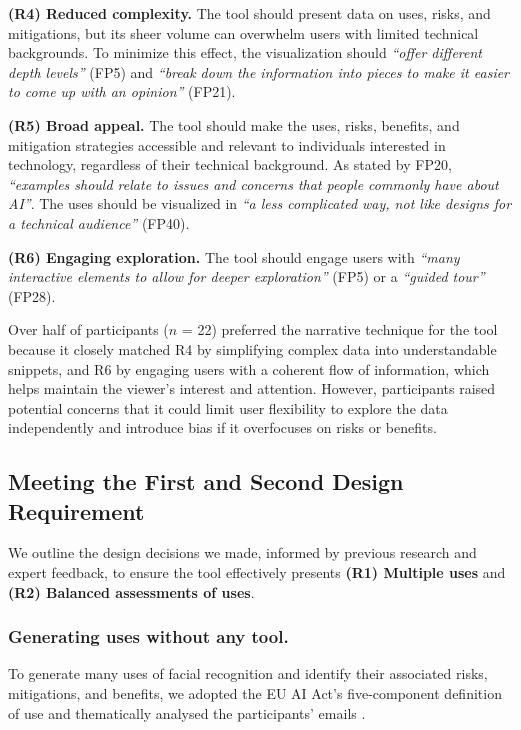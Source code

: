 \vspace{1.25pt}
\noindent\textbf{(R4) Reduced complexity.} 
The tool should present data on uses, risks, and mitigations, but its sheer volume can overwhelm users with limited technical backgrounds. To minimize this effect, the visualization should \emph{``offer different depth levels''} (FP5) and \emph{``break down the information into pieces to make it easier to come up with an opinion''} (FP21).

\vspace{1.25pt}
\noindent\textbf{(R5) Broad appeal.} 
The tool should make the uses, risks, benefits, and mitigation strategies accessible and relevant to individuals interested in technology, regardless of their technical background. As stated by FP20, \emph{``examples should relate to issues and concerns that people commonly have about AI''}. The uses should be visualized in \emph{``a less complicated way, not like designs for a technical audience''} (FP40).

\vspace{1.25pt}
\noindent\textbf{(R6) Engaging exploration.} 
The tool should engage users with \emph{``many interactive elements to allow for deeper exploration''} (FP5) or a \emph{``guided tour''} (FP28).

Over half of participants ($n$ = 22) preferred the narrative technique for the tool because it closely matched R4 by simplifying complex data into understandable snippets, and R6 by engaging users with a coherent flow of information, which helps maintain the viewer’s interest and attention. However, participants raised potential concerns that it could limit user flexibility to explore the data independently and introduce bias if it overfocuses on risks or benefits.

\subsection{Meeting the First and Second Design Requirement}
We outline the design decisions we made, informed by previous research and expert feedback, to ensure the tool effectively presents \textbf{(R1) Multiple uses} and \textbf{(R2) Balanced assessments of uses}.

\subsubsection{Generating uses without any tool.}
To generate many uses of facial recognition and identify their associated risks, mitigations, and benefits, we adopted the EU AI Act's five-component definition of use \cite{Golpayegani2023Risk} and thematically analysed the participants' emails \cite{miles1994qualitative}.

